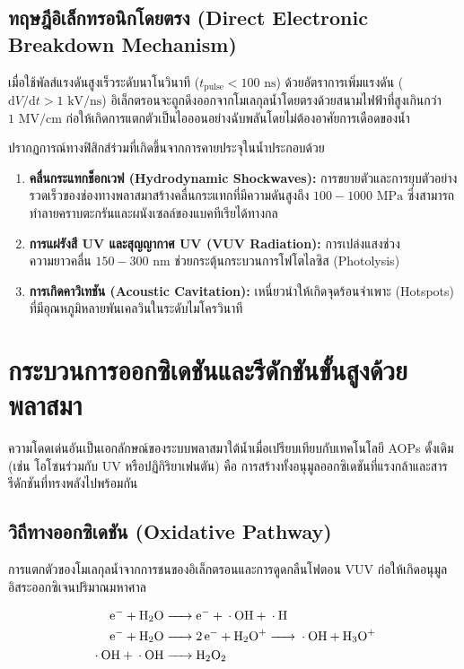 \subsection{ทฤษฎีอิเล็กทรอนิกโดยตรง (Direct Electronic Breakdown Mechanism)}
เมื่อใช้พัลส์แรงดันสูงเร็วระดับนาโนวินาที ($t_{\text{pulse}} < 100 \text{ ns}$) ด้วยอัตราการเพิ่มแรงดัน ($\text{d}V/\text{d}t > 1 \text{ kV/ns}$) อิเล็กตรอนจะถูกดึงออกจากโมเลกุลน้ำโดยตรงด้วยสนามไฟฟ้าที่สูงเกินกว่า $1 \text{ MV/cm}$ ก่อให้เกิดการแตกตัวเป็นไอออนอย่างฉับพลันโดยไม่ต้องอาศัยการเดือดของน้ำ

ปรากฏการณ์ทางฟิสิกส์ร่วมที่เกิดขึ้นจากการคายประจุในน้ำประกอบด้วย
\begin{enumerate}
    \item \textbf{คลื่นกระแทกช็อกเวฟ (Hydrodynamic Shockwaves):} การขยายตัวและการยุบตัวอย่างรวดเร็วของช่องทางพลาสมาสร้างคลื่นกระแทกที่มีความดันสูงถึง $100 - 1000 \text{ MPa}$ ซึ่งสามารถทำลายคราบตะกรันและผนังเซลล์ของแบคทีเรียได้ทางกล
    \item \textbf{การแผ่รังสี UV และสุญญากาศ UV (VUV Radiation):} การเปล่งแสงช่วงความยาวคลื่น $150 - 300 \text{ nm}$ ช่วยกระตุ้นกระบวนการโฟโตไลซิส (Photolysis)
    \item \textbf{การเกิดคาวิเทชัน (Acoustic Cavitation):} เหนี่ยวนำให้เกิดจุดร้อนจำเพาะ (Hotspots) ที่มีอุณหภูมิหลายพันเคลวินในระดับไมโครวินาที
\end{enumerate}

\section{กระบวนการออกซิเดชันและรีดักชันขั้นสูงด้วยพลาสมา}

ความโดดเด่นอันเป็นเอกลักษณ์ของระบบพลาสมาใต้น้ำเมื่อเปรียบเทียบกับเทคโนโลยี AOPs ดั้งเดิม (เช่น โอโซนร่วมกับ UV หรือปฏิกิริยาเฟนตัน) คือ การสร้างทั้งอนุมูลออกซิเดชันที่แรงกล้าและสารรีดักชันที่ทรงพลังไปพร้อมกัน

\subsection{วิถีทางออกซิเดชัน (Oxidative Pathway)}
การแตกตัวของโมเลกุลน้ำจากการชนของอิเล็กตรอนและการดูดกลืนโฟตอน VUV ก่อให้เกิดอนุมูลอิสระออกซิเจนปริมาณมหาศาล

\begin{align}
    \ce{e- + H2O} &\ce{-> e- + \cdot OH + \cdot H} \label{eq:water_dissoc} \\
    \ce{e- + H2O} &\ce{-> 2 e- + H2O+ -> \cdot OH + H3O+} \label{eq:water_ioniz} \\
    \ce{\cdot OH + \cdot OH} &\ce{-> H2O2} \label{eq:h2o2_comb}
\end{align}

